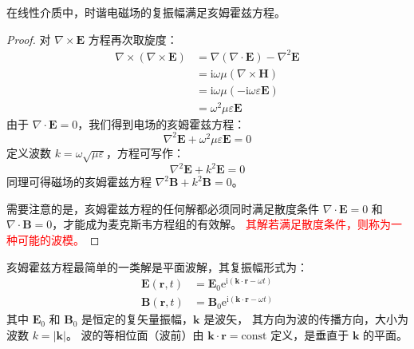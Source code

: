 \documentclass[fontset=none]{ctexart}
\begin{document}
\begin{theorem}[亥姆霍兹方程]
在线性介质中，时谐电磁场的复振幅满足亥姆霍兹方程。
\end{theorem}
\begin{proof}
对 $\nabla \times \bm{E}$ 方程再次取旋度：
\begin{equation}
\begin{aligned}
\nabla \times (\nabla \times \bm{E}) &= \nabla(\nabla \cdot \bm{E}) - \nabla^2 \bm{E} \\
&= \mathrm{i}\omega\mu (\nabla \times \bm{H}) \\
&= \mathrm{i}\omega\mu (-\mathrm{i}\omega\varepsilon\bm{E}) \\
&= \omega^2\mu\varepsilon\bm{E}
\end{aligned}
\end{equation}
由于 $\nabla \cdot \bm{E} = 0$，我们得到电场的亥姆霍兹方程：
\begin{equation}
\nabla^2 \bm{E} + \omega^2\mu\varepsilon \bm{E} = 0
\end{equation}
定义波数 $k = \omega\sqrt{\mu\varepsilon}$，方程可写作：
\begin{equation}
\nabla^2 \bm{E} + k^2 \bm{E} = 0
\end{equation}
同理可得磁场的亥姆霍兹方程 $\nabla^2 \bm{B} + k^2 \bm{B} = 0$。

需要注意的是，亥姆霍兹方程的任何解都必须同时满足散度条件 $\nabla \cdot \bm{E} = 0$ 
和 $\nabla \cdot \bm{B} = 0$，才能成为麦克斯韦方程组的有效解。
\textcolor{red}{其解若满足散度条件，则称为一种可能的波模。}
\end{proof}

\begin{definition}[平面电磁波]
亥姆霍兹方程最简单的一类解是平面波解，其复振幅形式为：
\begin{equation}
\begin{aligned}
\bm{E}(\bm{r}, t) &= \bm{E}_0 \mathrm{e}^{\mathrm{i}(\bm{k} \cdot \bm{r} - \omega t)} \\
\bm{B}(\bm{r}, t) &= \bm{B}_0 \mathrm{e}^{\mathrm{i}(\bm{k} \cdot \bm{r} - \omega t)}
\end{aligned}
\end{equation}
其中 $\bm{E}_0$ 和 $\bm{B}_0$ 是恒定的复矢量振幅，$\bm{k}$ 是波矢，
其方向为波的传播方向，大小为波数 $k=|\bm{k}|$。
波的等相位面（波前）由 $\bm{k} \cdot \bm{r} = \text{const}$ 定义，是垂直于 $\bm{k}$ 的平面。
\end{definition}
\end{document}
